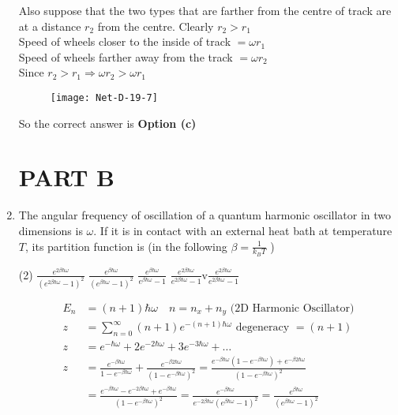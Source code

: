 \begin{enumerate}
\begin{answer}
		Also suppose that the two types that are farther from the centre of track are at a distance $r_{2}$ from the centre. Clearly $r_{2}>r_{1}$\\
	Speed of wheels closer to the inside of track $=\omega r_{1}$\\
	Speed of wheels farther away from the track $=\omega r_{2}$\\
	Since $r_{2}>r_{1} \Rightarrow \omega r_{2}>\omega r_{1}$
	\begin{figure}[H]
		\centering
		\texttt{[image: Net-D-19-7]}
	\end{figure}
			So the correct answer is \textbf{Option (c)}
\end{answer}
\section{PART B}
\item The angular frequency of oscillation of a quantum harmonic oscillator in two dimensions is $\omega$. If it is in contact with an external heat bath at temperature $T$, its partition function is (in the following $\beta=\frac{1}{k_{B} T}$ )
 \begin{tasks}(2)
	\task[\textbf{a.}]$\frac{e^{2 \beta \hbar \omega}}{\left(e^{2 \beta \hbar \omega}-1\right)^{2}}$
	\task[\textbf{b.}]$\frac{e^{\beta \hbar \omega}}{\left(e^{\beta \hbar \omega}-1\right)^{2}}$
	\task[\textbf{c.}]$\frac{e^{\beta \hbar \omega}}{e^{\beta \hbar \omega}-1}$
	\task[\textbf{d.}] $\frac{e^{2 \beta \hbar \omega}}{e^{2 \beta \hbar \omega}-1}$v$\frac{e^{2 \beta \hbar \omega}}{e^{2 \beta \hbar \omega}-1}$
\end{tasks}
\begin{answer}
	\begin{align*}
	E_{n}&=(n+1) \hbar \omega \quad n=n_{x}+n_{y}
\text{	(2D Harmonic Oscillator)}\\
z&=\sum_{n=0}^{\infty}(n+1) e^{-(n+1) \hbar \omega} \text { degeneracy }=(n+1)\\
z&=e^{-\hbar \omega}+2 e^{-2 \hbar \omega}+3 e^{-3 \hbar \omega}+\ldots\\
z&=\frac{e^{-\beta \hbar \omega}}{1-e^{-\beta \hbar \omega}}+\frac{e^{-\beta 2 \hbar \omega}}{\left(1-e^{-\beta \hbar \omega}\right)^{2}}=\frac{e^{-\beta \hbar \omega}\left(1-e^{-\beta \hbar \omega}\right)+e^{-\beta 2 \hbar \omega}}{\left(1-e^{-\beta \hbar \omega}\right)^{2}}\\
&=\frac{e^{-\beta \hbar \omega}-e^{-2 \beta \hbar \omega}+e^{-\beta \hbar \omega}}{\left(1-e^{-\beta \hbar \omega}\right)^{2}}=\frac{e^{-\beta \hbar \omega}}{e^{-2 \beta \hbar \omega}\left(e^{\beta \hbar \omega}-1\right)^{2}}=\frac{e^{\beta \hbar \omega}}{\left(e^{\beta \hbar \omega}-1\right)^{2}}\\

\end{align*}
\end{answer}
\end{enumerate}

